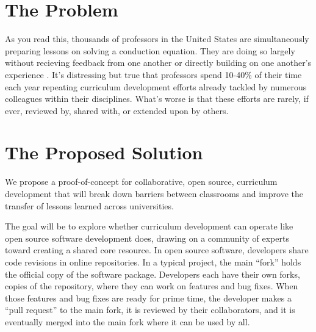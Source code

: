 \documentclass[11pt]{article}
\makeatletter
\newcommand{\authorname}{Kathryn~D.~Huff }
\newcommand{\authoremail}{katyhuff@illinois.edu}
\newcommand{\authorsite}{arfc.npre.illinois.edu}
\makeatother
\begin{document}
          \pagestyle{fancy}
          \lhead{\textcolor{gray}{Investigator: Prof. \authorname\\\authoremail}}
          \rhead{\textcolor{gray}{Advanced Reactors and Fuel Cycles\\Dept. of Nuclear, 
          Plasma, and Radiological Engineering}}
          \renewcommand{\headrulewidth}{0pt}
          \renewcommand{\footrulewidth}{0pt}
          \fancyfoot[C]{\footnotesize \textcolor{gray}{\authorsite}}

          \section{The Problem}
          As you read this, thousands of professors in the United States are 
          simultaneously preparing lessons on solving a conduction equation. 
          They are doing so largely without recieving feedback from one another 
          or directly building on one another's experience 
          \cite{wilson_software_2014}.  It's distressing but true that 
          professors spend 10-40\% of their time each year repeating curriculum 
          development efforts already tackled by numerous colleagues within 
          their disciplines. What's worse is that these efforts are rarely, if 
          ever, reviewed by, shared with, or extended upon by others.

          \section{The Proposed Solution}
          We propose a proof-of-concept for collaborative, open source, 
          curriculum development that will break down barriers between 
          classrooms and improve the transfer of lessons learned across universities.
          
          The goal will be to explore whether curriculum development can 
          operate like open source software development does, drawing on a 
          community of experts toward creating a shared core resource. In open 
          source software, developers share code revisions in online 
          repositories. In a typical project, the main ``fork'' holds the 
          official copy of the software package. Developers each have their own 
          forks, copies of the repository, where they can work on features and 
          bug fixes. When those features and bug fixes are ready for prime 
          time, the developer makes a ``pull request'' to the main fork, it is 
          reviewed by their collaborators, and it is eventually merged into the 
          main fork where it can be used by all. 
\end{document}
